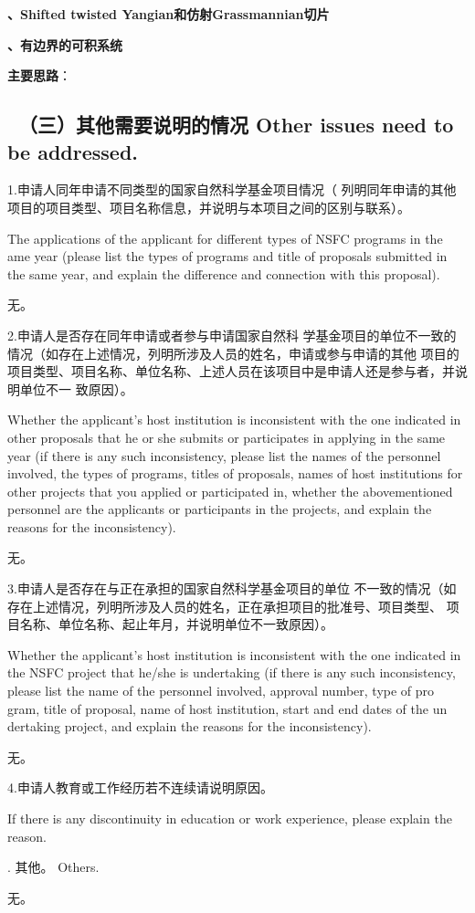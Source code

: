 \documentclass[12pt,UTF8,AutoFakeBold=4,a4paper]{ctexart}
\begin{document}
\medskip

\textbf{、Shifted twisted Yangian和仿射Grassmannian切片}

\medskip

\textbf{、有边界的可积系统}

\textbf{主要思路}：


{\color{MsBlue} \subsection{\sihao \kaishu \quad \ \bfseries（三）其他需要说明的情况 
\xiaosihao {} Other issues need to be addressed.}}
%

{\sihao \color{MsBlue} \kaishu 1.申请人同年申请不同类型的国家自然科学基金项目情况（
列明同年申请的其他项目的项目类型、项目名称信息，并说明与本项目之间的区别与联系）。}

{\color{MsBlue} \xiaosihao {} 
The applications of the applicant for different types of NSFC programs in the 
ame year (please list the types of programs and title of proposals submitted 
in the same year, and explain the difference and connection with this proposal).}

无。

{\sihao \color{MsBlue} \kaishu 2.申请人是否存在同年申请或者参与申请国家自然科
学基金项目的单位不一致的情况（如存在上述情况，列明所涉及人员的姓名，申请或参与申请的其他
项目的项目类型、项目名称、单位名称、上述人员在该项目中是申请人还是参与者，并说明单位不一
致原因）。}

{\color{MsBlue} \xiaosihao {} 
Whether the applicant's host institution is inconsistent with the one indicated 
in other proposals that he or she submits or participates in applying in the 
same year (if there is any such inconsistency, please list the names of the 
personnel involved, the types of programs, titles of proposals, names of host 
institutions for other projects that you applied or participated in, whether 
the abovementioned personnel are the applicants or participants in the projects, 
and explain the reasons for the inconsistency).}

无。

{\sihao \color{MsBlue} \kaishu 3.申请人是否存在与正在承担的国家自然科学基金项目的单位
不一致的情况（如存在上述情况，列明所涉及人员的姓名，正在承担项目的批准号、项目类型、
项目名称、单位名称、起止年月，并说明单位不一致原因）。}

{\color{MsBlue} \xiaosihao {} 
Whether the applicant's host institution is inconsistent with the one indicated 
in the NSFC project that he/she is undertaking (if there is any such inconsistency, please list the name of the personnel involved, approval number, type of pro
gram, title of proposal, name of host institution, start and end dates of the un
dertaking project, and explain the reasons for the inconsistency).}

无。

{\sihao \color{MsBlue} \kaishu 4.申请人教育或工作经历若不连续请说明原因。}

{\color{MsBlue} \xiaosihao {} 
If there is any discontinuity in education or work experience, please explain 
the reason.}

{\sihao \color{MsBlue} . 其他。 
\xiaosihao {} Others.}


无。
\end{document}
